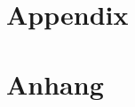 
{\chapter{Appendix}}    %
{\chapter{Anhang}}      %
\label{chap:appendix}



		
\setcounter{figure}{0}
		
